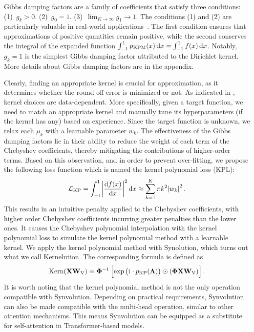 Gibbs damping factors are a family of coefficients that satisfy three conditions: (1)~$g_{k} > 0$. (2)~$g_{0} = 1$. (3)~$\lim_{K \to \infty} {g_{1} \to 1}$. The conditions (1) and (2) are particularly valuable in real-world applications~\citep{RevModPhys.78.275,Weiße2008}. The first condition ensures that approximations of positive quantities remain positive, while the second conserves the integral of the expanded function $\int_{-1}^{1}p_{\text{KPM}}(x)\mathop{}\!\mathrm{d}{x} = \int_{-1}^{1}f(x)\mathop{}\!\mathrm{d}{x}$. Notably, $g_{k} = 1$ is the simplest Gibbs damping factor attributed to the Dirichlet kernel. More details about Gibbs damping factors are in the appendix.

Clearly, finding an appropriate kernel is crucial for approximation, as it determines whether the round-off error is minimized or not. As indicated in \citep{RevModPhys.78.275,Weiße2008}, kernel choices are data-dependent. More specifically, given a target function, we need to match an appropriate kernel and manually tune its hyperparameters (if the kernel has any) based on experience. Since the target function is unknown, we relax each $\mu_{k}$ with a learnable parameter $w_{k}$. The effectiveness of the Gibbs damping factors lie in their ability to reduce the weight of each term of the Chebyshev coefficients, thereby mitigating the contributions of higher-order terms. Based on this observation, and in order to prevent over-fitting, we propose the following loss function which is named the kernel polynomial loss (KPL):
\begin{equation}\label{eq:kpl}
\centering
\mathcal{L}_{\text{KP}} = \int_{-1}^{1}\abs{\frac{\diff{f(x)}}{\diff{x}}}^{2}\diff{x} \approx \sum_{k=1}^{K}{\pi}{k}^{2}\abs{w_{k}}^{2}.
\end{equation}
This results in an intuitive penalty applied to the Chebyshev coefficients, with higher order Chebyshev coefficients incurring greater penalties than the lower ones. It causes the Chebyshev polynomial interpolation with the kernel polynomial loss to simulate the kernel polynomial method with a learnable kernel. We apply the kernel polynomial method with Synolution, which turns out what we call Kernelution. The corresponding formula is defined as
\begin{equation}\label{eq:kernelution}
\centering
\mathrm{Kern}(\mathbf{X}\mathbf{W}_{\text{V}})
= \bm{\Phi}^{-1}\left[\exp\left(\ramuno\cdot{p}_{\text{KP}}(\mathbf{\Lambda})\right)\odot(\bm{\Phi}\mathbf{X}\mathbf{W}_{\text{V}})\right].
\end{equation}
It is worth noting that the kernel polynomial method is not the only operation compatible with Synvolution. Depending on practical requirements, Synvolution can also be made compatible with the multi-head operation, similar to other attention mechanisms. This means Synvolution can be equipped as a substitute for self-attention in Transformer-based models.

